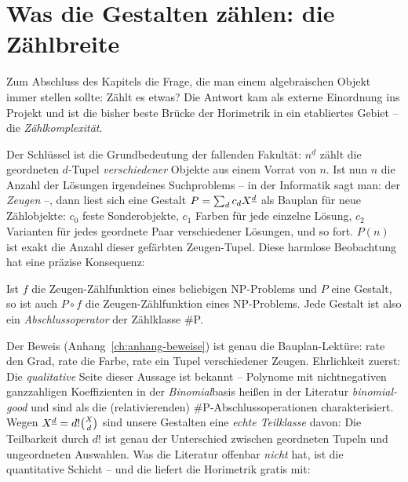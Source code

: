 \section{Was die Gestalten zählen: die Zählbreite}
\label{sec:zaehlbreite}

Zum Abschluss des Kapitels die Frage, die man einem algebraischen
Objekt immer stellen sollte: Zählt es etwas? Die Antwort kam als
externe Einordnung ins Projekt und ist die bisher beste Brücke der
Horimetrik in ein etabliertes Gebiet -- die \emph{Zählkomplexität}.

Der Schlüssel ist die Grundbedeutung der fallenden Fakultät:
$n^{\underline d}$ zählt die geordneten $d$-Tupel
\emph{verschiedener} Objekte aus einem Vorrat von $n$. Ist nun $n$
die Anzahl der Lösungen irgendeines Suchproblems -- in der
Informatik sagt man: der \emph{Zeugen} --, dann liest sich eine
Gestalt $P=\sum_d c_dX^{\underline{d}}$ als Bauplan für neue Zählobjekte:
$c_0$ feste Sonderobjekte, $c_1$ Farben für jede einzelne Lösung,
$c_2$ Varianten für jedes geordnete Paar verschiedener Lösungen,
und so fort. $P(n)$ ist exakt die Anzahl dieser gefärbten
Zeugen-Tupel. Diese harmlose Beobachtung hat eine präzise
Konsequenz:

\begin{satz}
Ist $f$ die Zeugen-Zählfunktion eines beliebigen NP-Problems und
$P$ eine Gestalt, so ist auch $P\circ f$ die Zeugen-Zählfunktion
eines NP-Problems. Jede Gestalt ist also ein
\emph{Abschlussoperator} der Zählklasse \#P.
\end{satz}

Der Beweis (Anhang~\ref{ch:anhang-beweise}) ist genau die
Bauplan-Lektüre: rate den Grad, rate die Farbe, rate ein Tupel
verschiedener Zeugen. Ehrlichkeit zuerst: Die \emph{qualitative}
Seite dieser Aussage ist bekannt -- Polynome mit nichtnegativen
ganzzahligen Koeffizienten in der \emph{Binomial}basis heißen in
der Literatur \emph{binomial-good} und sind als die
(relativierenden) \#P-Abschlussoperationen charakterisiert. Wegen
$X^{\underline{d}}=d!\binom Xd$ sind unsere Gestalten eine \emph{echte
Teilklasse} davon: Die Teilbarkeit durch $d!$ ist genau der
Unterschied zwischen geordneten Tupeln und ungeordneten Auswahlen.
Was die Literatur offenbar \emph{nicht} hat, ist die quantitative
Schicht -- und die liefert die Horimetrik gratis mit:

